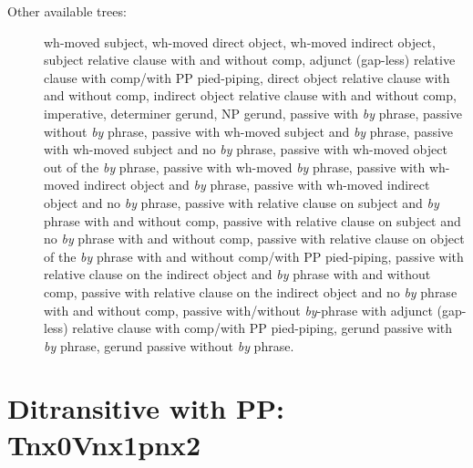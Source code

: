 \begin{description}
\item[Other available trees:] wh-moved subject, wh-moved direct object, 
wh-moved indirect object, subject relative clause with and without comp, 
adjunct (gap-less) relative clause with comp/with PP pied-piping, direct object relative 
clause with and without comp, indirect object relative clause with and without comp, 
imperative, determiner gerund, NP 
gerund, passive with {\it by} phrase, passive without {\it by} phrase, 
passive with wh-moved subject and {\it by} phrase, passive with wh-moved 
subject and no {\it by} phrase, passive with wh-moved object out of the 
{\it by} phrase, passive with wh-moved {\it by} phrase, passive with 
wh-moved indirect object and {\it by} phrase, passive with wh-moved 
indirect object and no {\it by} phrase, passive with relative clause on 
subject and {\it by} phrase with and without comp, 
passive with relative clause on subject and no 
{\it by} phrase with and without comp, passive with relative clause on object of the {\it by} 
phrase with and without comp/with PP pied-piping, 
passive with relative clause on the indirect object and {\it by} 
phrase with and without comp, passive with relative clause on the indirect object and no {\it by} 
phrase with and without comp, passive with/without {\it by}-phrase with adjunct 
(gap-less) relative clause with comp/with PP pied-piping, 
gerund passive with {\it by} phrase, gerund passive without {\it by} phrase. 
 
 
\end{description} 
 
 
 
 
 
\section{Ditransitive with PP: Tnx0Vnx1pnx2} 
\label{nx0Vnx1pnx2-family} 
 
